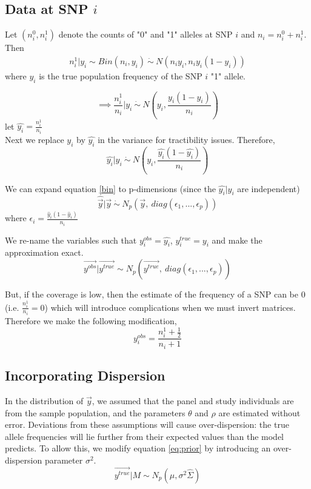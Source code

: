 \documentclass[10pt,a4paper,draft]{article}
\begin{document}
\subsection{Data at SNP $i$}
Let $(n_i^0, n_i^1)$ denote the counts of "0" and "1" alleles at SNP $i$ and $n_i = n_i^0 + n_i^1$. Then 
\begin{align*}
n_i^1 | y_i \sim Bin(n_i, y_i) \ \dot{\sim}  \ N(n_iy_i, n_iy_i(1-y_i)) \label{eq:napprox}
\end{align*}
where $y_i$ is the true population frequency of the SNP $i$ "1" allele. 


\begin{equation}
\implies \frac{n_i^1}{n_i} | y_i \ \dot{\sim} \ N(y_i, \frac{y_i(1-y_i)}{n_i})
\end{equation}
let $\hat{y_i} = \frac{n_i^1}{n_i}$\\
Next we replace $y_i$ by $\hat{y_i}$ in the variance for tractibility issues. Therefore,
\begin{equation} 
 \hat{y_i} | y_i \ \dot{\sim} \ N(y_i, \frac{\hat{y_i}(1-\hat{y_i})}{n_i}) \label{bin}
\end{equation}

We can expand equation \ref{bin} to p-dimensions (since the $\hat{y_i} | y_i$ are independent)
\begin{equation}
\hat{\vec{y}} | \vec{y} \ \dot{\sim} \ N_p(\vec{y}, \ diag(\epsilon_1,...,\epsilon_p))
\end{equation}
where $\epsilon_i = \frac{\hat{y}_i (1-\hat{y}_i)}{n_i}$ 

We re-name the variables such that $y_i^{obs} = \hat{y_i}$, $y^{true}_i = y_i$ and make the approximation exact.
\begin{equation}
\vec{y^{obs}} | \vec{y^{true}} \sim  N_p(\vec{y^{true}}, \ diag(\epsilon_1,...,\epsilon_p))
\end{equation}


But, if the coverage is low, then the estimate of the frequency of a SNP can be 0 (i.e. $\frac{n_i^1}{n_i}=0$) which will introduce complications when we must invert matrices. Therefore we make the following modification,
\begin{equation}
y_i^{obs} = \frac{n_i^1+\frac{1}{2}}{n_i + 1}
\end{equation} 

\subsection{Incorporating Dispersion}
In the distribution of $\vec{y}$, we assumed that the panel and study individuals are from the sample population, and the parameters $\theta$ and $\rho$ are estimated without error. Deviations from these assumptions will cause over-dispersion: the true allele frequencies will lie further from their expected values than the model predicts. To allow this, we modify equation \ref{eq:prior} by introducing an over-dispersion parameter $\sigma^2$.
\begin{equation}
\vec{y^{true}}|M \sim N_p(\hat{\mu}, \sigma^2\hat{\Sigma})
\end{equation}
\end{document}
